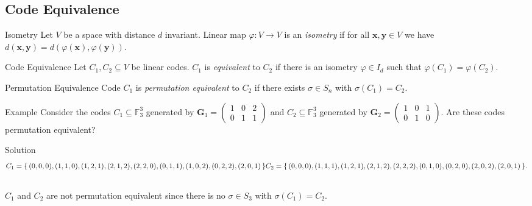 \subsection{Code Equivalence}
\begin{frame}[allowframebreaks]
    \begin{block}{Isometry}
        Let $V$ be a space with distance $d$ invariant. Linear map $\varphi: V \xrightarrow{}V$ is an \textit{isometry} if for all $\mathbf{x}, \mathbf{y} \in V$ we have $d(\mathbf{x}, \mathbf{y}) = d(\varphi(\mathbf{x}), \varphi(\mathbf{y}))$. 
    \end{block}

    \begin{block}{Code Equivalence}
        Let $C_1, C_2 \subseteq V$ be linear codes. $C_1$ is \textit{equivalent} to $C_2$ if there is an isometry $\varphi \in I_d$ such that $\varphi(C_1) = \varphi(C_2)$.
    \end{block}

    \begin{block}{Permutation Equivalence}
        Code $C_1$ is \textit{permutation equivalent} to $C_2$ if there exists $\sigma \in S_n$ with $\sigma(C_1) = C_2$.   
    \end{block}
    
\framebreak

    \begin{exampleblock}{Example}
        Consider the codes $C_1 \subseteq \mathbb{F}_3^3$ generated by $\mathbf{G}_1 = \begin{pmatrix}
        1 & 0 & 2 \\ 0 & 1 & 1
    \end{pmatrix}$ and $C_2 \subseteq \mathbb{F}_3^3$ generated by $\mathbf{G}_2 = \begin{pmatrix}
        1 & 0 & 1 \\ 0 & 1 & 0
    \end{pmatrix}$. Are these codes permutation equivalent?
    \end{exampleblock}

    \begin{block}{Solution}
    \[C_1 = \{\,(0,0,0),(1,1,0),(1,2,1),(2,1,2),(2,2,0),(0,1,1),(1,0,2),(0,2,2),(2,0,1) \,\}\\
    C_2 = \{\,(0,0,0),(1,1,1),(1,2,1),(2,1,2),(2,2,2),(0,1,0),(0,2,0),(2,0,2),(2,0,1) \,\}.
    \]\\
    $C_1$ and $C_2$ are not permutation equivalent since there is no $\sigma \in S_3$ with $\sigma(C_1)=C_2$.
    \end{block}


\end{frame}
